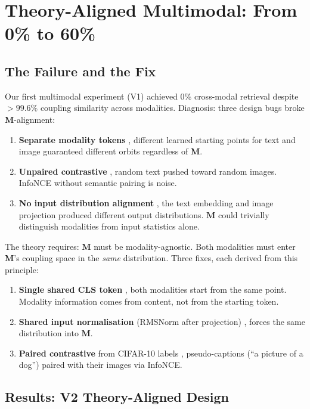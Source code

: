 \documentclass[11pt, a4paper]{article}
\newcommand{\M}{\mathbf{M}}
\theoremstyle{plain}
\theoremstyle{remark}
\begin{document}
\section{Theory-Aligned Multimodal: From 0\% to 60\%}
\label{sec:theory-aligned-results}

\subsection{The Failure and the Fix}

Our first multimodal experiment (V1) achieved 0\% cross-modal retrieval despite $>99.6\%$ coupling similarity across modalities.
Diagnosis: three design bugs broke $\M$-alignment:
\begin{enumerate}[nosep]
    \item \textbf{Separate modality tokens} ,  different learned starting points for text and image guaranteed different orbits regardless of $\M$.
    \item \textbf{Unpaired contrastive} ,  random text pushed toward random images. InfoNCE without semantic pairing is noise.
    \item \textbf{No input distribution alignment} ,  the text embedding and image projection produced different output distributions. $\M$ could trivially distinguish modalities from input statistics alone.
\end{enumerate}

The theory requires: $\M$ must be modality-agnostic.
Both modalities must enter $\M$'s coupling space in the \emph{same} distribution.
Three fixes, each derived from this principle:
\begin{enumerate}[nosep]
    \item \textbf{Single shared CLS token} ,  both modalities start from the same point. Modality information comes from content, not from the starting token.
    \item \textbf{Shared input normalisation} (RMSNorm after projection) ,  forces the same distribution into $\M$.
    \item \textbf{Paired contrastive} from CIFAR-10 labels ,  pseudo-captions (``a picture of a dog'') paired with their images via InfoNCE.
\end{enumerate}

\subsection{Results: V2 Theory-Aligned Design}
\end{document}

